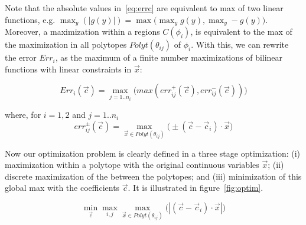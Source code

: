 Note that the absolute values in~\ref{eq:errc} are equivalent to max of two linear functions, e.g. $\max_y (|g(y)|) = \max \big( \max_y g(y), \max_y -g(y) \big)$. Moreover, a maximization within a regions $C(\phi_i)$, is equivalent to the max of the maximization in all polytopes $Polyt(\theta_{ij})$ of $\phi_i$. With this, we can rewrite the error $Err_i$, as the maximum of a finite number maximizations of bilinear functions with linear constraints in $\vec{x}$:
{\footnotesize 
\vspace{-2mm}
\begin{equation} Err_i(\vec{c}) = \max_{j=1..n_i} \big( max ( err^+_{ij}(\vec{c}), err^-_{ij}(\vec{c}) ) \big) \label{eq:errcij} \end{equation}
\vspace{-5mm}

where, for $i=1,2$ and $j=1..n_i$
\vspace{-1mm}
\begin{equation} err^{\pm}_{ij}(\vec{c}) = \max_{\vec{x} \in Polyt(\theta_{ij})} \big( \pm(\vec{c} - \vec{c}_i)\cdot \vec{x} \big)  \label{eq:polymax} \end{equation}
\vspace{-2mm}
}

Now our optimization problem is clearly defined in a three stage optimization: (i) maximization within a polytope with the original continuous variables $\vec{x}$; (ii) discrete maximization of the between the polytopes; and (iii) minimization of this global max with the coefficients $\vec{c}$. It is illustrated in figure~\ref{fig:optim}.

\begin{equation} \min_{\vec{c}} \max_{i,j} \max_{\vec{x} \in Polyt(\theta_{ij})} \big( |(\vec{c} - \vec{c}_i)\cdot \vec{x}| \big)  \label{eq:optimglo} \end{equation}

